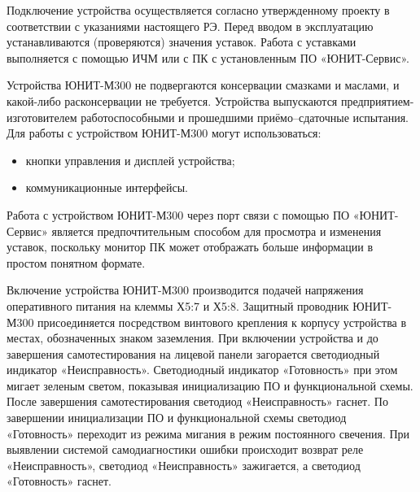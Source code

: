 Подключение  устройства  осуществляется  согласно  утвержденному  проекту  в  соответствии  с указаниями настоящего РЭ. 
Перед  вводом  в  эксплуатацию  устанавливаются  (проверяются)  значения  уставок.  Работа  с уставками выполняется с помощью ИЧМ или с ПК с установленным ПО «ЮНИТ-Сервис».

{
\vspace{2mm}
\color{black}
\nopagebreak
\vspace{3mm}
}

\par
Устройства  ЮНИТ-М300  не  подвергаются  консервации  смазками  и  маслами,  и  какой-либо расконсервации не требуется. Устройства выпускаются предприятием-изготовителем  работоспособными  и  прошедшими  приёмо--сдаточные испытания.
Для работы с устройством ЮНИТ-М300 могут использоваться:
\begin{itemize}
\item кнопки управления и дисплей устройства; 
\item коммуникационные интерфейсы.
\end{itemize}
Работа  с  устройством  ЮНИТ-М300  через  порт  связи  с  помощью  ПО  «ЮНИТ-Сервис»  является 
предпочтительным  способом  для  просмотра  и  изменения  уставок,  поскольку  монитор  ПК  может 
отображать больше информации в простом понятном формате.


{
\color{black}
\nopagebreak
\vspace{3mm}
}

{
\vspace{2mm}
\color{black}
\nopagebreak
\vspace{3mm}
}

\par
Включение  устройства  ЮНИТ-М300 производится  подачей  напряжения  оперативного  питания  на клеммы Х5:7 и Х5:8. Защитный проводник ЮНИТ-М300 присоединяется посредством винтового крепления к 
корпусу устройства в местах, обозначенных знаком заземления. При  включении  устройства  и  до  завершения  самотестирования  на  лицевой  панели  загорается светодиодный  индикатор    «Неисправность». Светодиодный  индикатор «Готовность»  при  этом мигает  зеленым  светом,  показывая  инициализацию  ПО  и  функциональной  схемы. После завершения 
самотестирования светодиод «Неисправность»  гаснет.  По  завершении  инициализации  ПО  и функциональной схемы светодиод «Готовность» переходит из режима мигания в режим постоянного 
свечения. При выявлении системой самодиагностики ошибки происходит возврат реле «Неисправность», светодиод   «Неисправность» зажигается, а светодиод «Готовность» гаснет.


